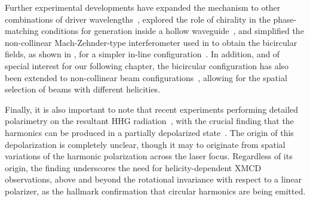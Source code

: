 
Further experimental developments have expanded the mechanism to other combinations of driver wavelengths~\cite{fan_bright-circularly_2015}, explored the role of chirality in the phase-matching conditions for generation inside a hollow waveguide~\cite{kfir_chiral-phase-matching_2016}, and simplified the non-collinear Mach-Zehnder-type interferometer used in  to obtain the bicircular fields, as shown in , for a simpler in-line configuration~\cite{kfir_in-line-bicircular_2016}. In addition, and of special interest for our following chapter, the bicircular configuration has also been extended to non-collinear beam configurations~\cite{hickstein_non-collinear_2015}, allowing for the spatial selection of beams with different helicities. 


Finally, it is also important to note that recent experiments performing detailed polarimetry on the resultant HHG radiation~\cite{veyrinhas_polarimetry-original_2013, veyrinhas_depolarized-hhg-atto_2015, chen_tomographic-hhg-polarimetry_2016}, with the crucial finding that the harmonics can be produced in a partially depolarized state~\cite{veyrinhas_depolarized-hhg-atto_2015}. The origin of this depolarization is completely unclear, though it may to originate from spatial variations of the harmonic polarization across the laser focus. Regardless of its origin, the finding underscores the need for helicity-dependent XMCD observations, above and beyond the rotational invariance with respect to a linear polarizer, as the hallmark confirmation that circular harmonics are being emitted.



